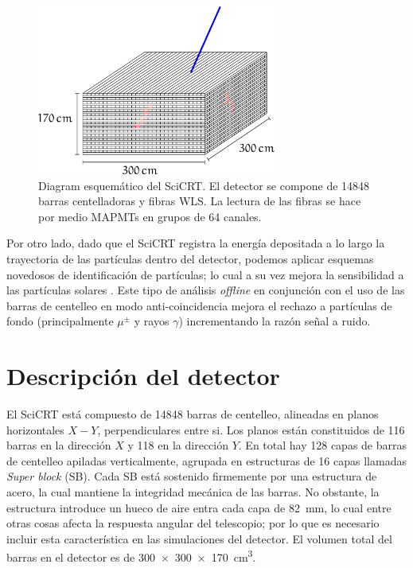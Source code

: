 \begin{figure}
        \centering
        \includegraphics[width=0.7\textwidth]{scibar-diagram.pdf}
        \caption{Diagram esquemático del SciCRT. El detector se compone de \num{14848} barras centelladoras y fibras WLS. La lectura de las fibras se hace por medio MAPMTs en grupos de \num{64} canales.}
        \label{fig:scibar-detector}
\end{figure}

Por otro lado, dado que el SciCRT registra la energía depositada a lo largo la trayectoria de las partículas dentro del detector, podemos aplicar esquemas novedosos de identificación de partículas; lo cual a su vez mejora la sensibilidad a las partículas solares \cite{garcia20}. Este tipo de análisis \emph{offline} en conjunción con el uso de las barras de centelleo en modo anti-coincidencia mejora el rechazo a partículas de fondo (principalmente $\mu^{\pm}$ y rayos $\gamma$) incrementando la razón señal a ruido.

\section{Descripción del detector}

El SciCRT está compuesto de \num{14848} barras de centelleo, alineadas en planos horizontales $X-Y$, perpendiculares entre si. Los planos están constituidos de \num{116} barras en la dirección $X$ y \num{118} en la dirección $Y$. En total hay \num{128} capas de barras de centelleo apiladas verticalmente, agrupada en estructuras de \num{16} capas llamadas \emph{Super block} (SB). Cada SB está sostenido firmemente por una estructura de acero, la cual mantiene la integridad mecánica de las barras. No obstante, la estructura introduce un hueco de aire entra cada capa de \SI{82}{\mm}, lo cual entre otras cosas afecta la respuesta angular del telescopio; por lo que es necesario incluir esta característica en las simulaciones del detector. El volumen total del barras en el detector es de \SI[product-units=power]{300x300x170}{\cubic\cm}.

